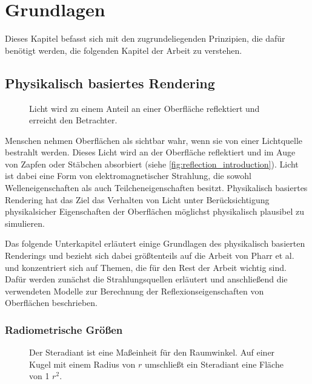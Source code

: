 \documentclass[thesis.tex]{subfiles}
\begin{document}
\chapter{Grundlagen}
\label{chap:prerequisites}

Dieses Kapitel befasst sich mit den zugrundeliegenden Prinzipien, die dafür benötigt werden, die folgenden Kapitel der Arbeit zu verstehen.

\section{Physikalisch basiertes Rendering}

\begin{figure}[ht!]
    \centering
    \caption{Licht wird zu einem Anteil an einer Oberfläche reflektiert und erreicht den Betrachter.}
    \label{fig:reflection_introduction}
\end{figure}

Menschen nehmen Oberflächen als sichtbar wahr, wenn sie von einer Lichtquelle bestrahlt werden. Dieses Licht wird an der Oberfläche reflektiert und im Auge von Zapfen oder Stäbchen absorbiert (siehe \autoref{fig:reflection_introduction}). Licht ist dabei eine Form von elektromagnetischer Strahlung, die sowohl Welleneigenschaften als auch Teilcheneigenschaften besitzt. Physikalisch basiertes Rendering hat das Ziel das Verhalten von Licht unter Berücksichtigung physikalsicher Eigenschaften der Oberflächen möglichst physikalisch plausibel zu simulieren. 

Das folgende Unterkapitel erläutert einige Grundlagen des physikalisch basierten Renderings und bezieht sich dabei größtenteils auf die Arbeit von Pharr et al. \cite{bib:Pharr2016} und konzentriert sich auf Themen, die für den Rest der Arbeit wichtig sind. Dafür werden zunächst die Strahlungsquellen erläutert und anschließend die verwendeten Modelle zur Berechnung der Reflexionseigenschaften von Oberflächen beschrieben.

\subsection{Radiometrische Größen}

\begin{figure}[ht!]
    \centering
    \caption{Der Steradiant ist eine Maßeinheit für den Raumwinkel. Auf einer Kugel mit einem Radius von $r$ umschließt ein Steradiant eine Fläche von 1 $r^2$.}
    \label{fig:steradiant}
\end{figure}
\end{document}

